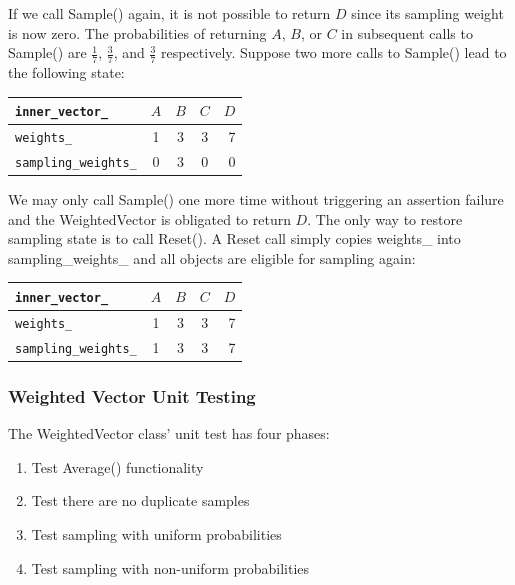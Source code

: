 \documentclass[12pt]{article}
\begin{document}
    If we call Sample() again, it is not possible to return $D$ since its
    sampling weight is now zero. The probabilities of returning $A$, $B$, or
    $C$ in subsequent calls to Sample() are $\frac{1}{7}$, $\frac{3}{7}$, and
    $\frac{3}{7}$ respectively. Suppose two more calls to Sample() lead to the
    following state:

    \begin{center}
      \begin{tabular}{ | l | c | c | c | r | }
        \hline
        \verb|inner_vector_| & $A$ & $B$ & $C$ & $D$ \\ \hline
        \verb|weights_| & 1 & 3 & 3 & 7 \\ \hline
        \verb|sampling_weights_| & 0 & 3 & 0 & 0 \\ \hline
        \hline
      \end{tabular}
    \end{center}

    We may only call Sample() one more time without triggering an assertion
    failure and the WeightedVector is obligated to return $D$. The only way to
    restore sampling state is to call Reset(). A Reset call simply copies
    weights\_ into sampling\_weights\_ and all objects are eligible for
    sampling again:

    \begin{center}
      \begin{tabular}{ | l | c | c | c | r | }
        \hline
        \verb|inner_vector_| & $A$ & $B$ & $C$ & $D$ \\ \hline
        \verb|weights_| & 1 & 3 & 3 & 7 \\ \hline
        \verb|sampling_weights_| & 1 & 3 & 3 & 7 \\ \hline
        \hline
      \end{tabular}
    \end{center}


    \subsubsection{Weighted Vector Unit Testing}

    The WeightedVector class' unit test has four phases:

    \begin{enumerate}
      \item Test Average() functionality
      \item Test there are no duplicate samples
      \item Test sampling with uniform probabilities
      \item Test sampling with non-uniform probabilities
    \end{enumerate}
\end{document}
